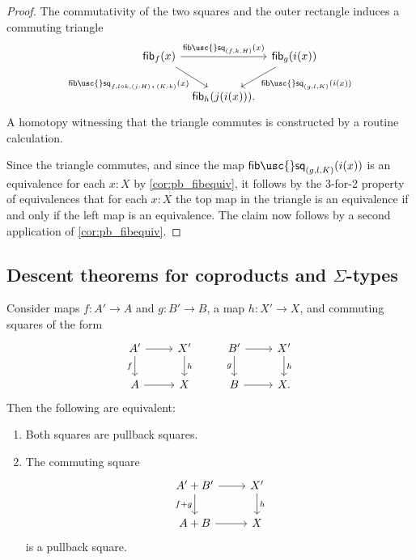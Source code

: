 \begin{proof}
The commutativity of the two squares and the outer rectangle induces a commuting triangle
\begin{equation*}
\begin{tikzcd}[column sep=tiny]
\fib{f}{x} \arrow[rr,"\mathsf{fib\usc{}sq}_{(f,k,H)}(x)"] \arrow[dr,swap,"\mathsf{fib\usc{}sq}_{f,l\circ k,\ct{(j\cdot H)}{(K\cdot k)}}(x)"] & & \fib{g}{i(x)} \arrow[dl,"\mathsf{fib\usc{}sq}_{(g,l,K)}(i(x))"] \\
& \fib{h}{j(i(x))}.
\end{tikzcd}
\end{equation*}
A homotopy witnessing that the triangle commutes is constructed by a routine calculation.

Since the triangle commutes, and since the map $\mathsf{fib\usc{}sq}_{(g,l,K)}(i(x))$ is an equivalence for each $x:X$ by \cref{cor:pb_fibequiv}, it follows
by the 3-for-2 property of equivalences that for each $x:X$ the top map in the triangle is an equivalence if and only if the left map is an equivalence.
The claim now follows by a second application of \cref{cor:pb_fibequiv}.
\end{proof}

\subsection{Descent theorems for coproducts and \texorpdfstring{$\Sigma$}{Σ}-types}

\begin{thm}\label{thm:descent-coprod}
Consider maps $f:A'\to A$ and $g:B'\to B$, a map $h:X'\to X$, and commuting squares of the form
\begin{equation*}
\begin{tikzcd}
A' \arrow[r] \arrow[d,swap,"f"] & X' \arrow[d,"h"] & B' \arrow[r] \arrow[d,swap,"g"] & X' \arrow[d,"h"] \\
A \arrow[r] & X & B \arrow[r] & X.
\end{tikzcd}
\end{equation*}
Then the following are equivalent:
\begin{enumerate}
\item Both squares are pullback squares.
\item The commuting square 
\begin{equation*}
\begin{tikzcd}
A'+B' \arrow[d,swap,"f+g"] \arrow[r] & X' \arrow[d,"h"] \\
A+B \arrow[r] & X
\end{tikzcd}
\end{equation*}
is a pullback square.
\end{enumerate}
\end{thm}

